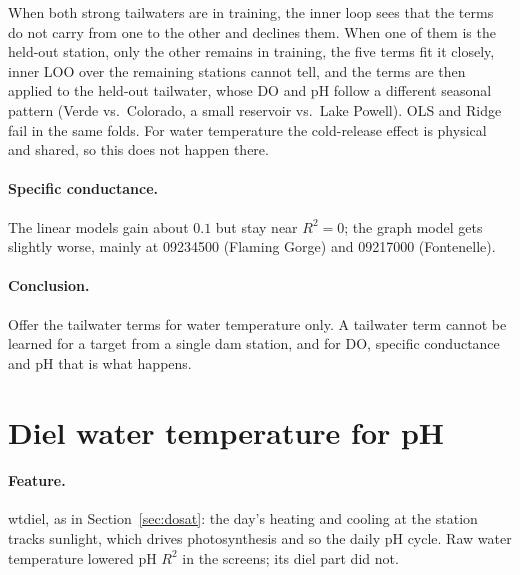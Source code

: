 \documentclass[11pt]{article}
\newcommand{\codeus}{\textunderscore\allowbreak}
\newcommand{\code}[1]{{\ttfamily\let\_\codeus #1}}
\begin{document}
When both strong tailwaters are in training, the inner loop sees that the terms do not carry
from one to the other and declines them. When one of them is the held-out station, only the
other remains in training, the five terms fit it closely, inner LOO over the remaining stations
cannot tell, and the terms are then applied to the held-out tailwater, whose DO and pH follow a
different seasonal pattern (Verde vs.\ Colorado, a small reservoir vs.\ Lake Powell). OLS and
Ridge fail in the same folds. For water temperature the cold-release effect is physical and
shared, so this does not happen there.

\paragraph{Specific conductance.} The linear models gain about $0.1$ but stay near $R^2=0$; the
graph model gets slightly worse, mainly at 09234500 (Flaming Gorge) and 09217000 (Fontenelle).

\paragraph{Conclusion.} Offer the tailwater terms for water temperature only. A tailwater term
cannot be learned for a target from a single dam station, and for DO, specific conductance and
pH that is what happens.

\section{Diel water temperature for pH}\label{sec:phdiel}

\paragraph{Feature.} \code{wt\_diel}, as in Section~\ref{sec:dosat}: the day's heating and
cooling at the station tracks sunlight, which drives photosynthesis and so the daily pH cycle.
Raw water temperature lowered pH $R^2$ in the screens; its diel part did not.
\end{document}
